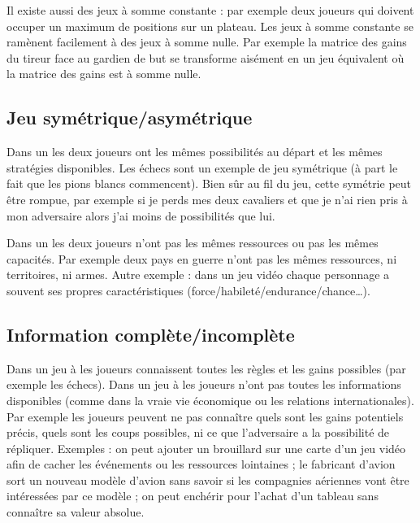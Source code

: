 \documentclass[11pt,class=report,crop=false]{standalone}
\begin{document}
Il existe aussi des jeux à somme constante : par exemple deux joueurs qui doivent occuper un maximum de positions sur un plateau. Les jeux à somme constante se ramènent facilement à des jeux à somme nulle. Par exemple la matrice des gains du tireur face au gardien de but se transforme aisément en un jeu équivalent où la matrice des gains est à somme nulle.






\subsection{Jeu symétrique/asymétrique}

Dans un  les deux joueurs ont les mêmes possibilités au départ et les mêmes stratégies disponibles. 
Les échecs sont un exemple de jeu symétrique (à part le fait que les pions blancs commencent). Bien sûr au fil du jeu, cette symétrie peut être rompue, par exemple si je perds mes deux cavaliers et que je n'ai rien pris à mon adversaire alors j'ai moins de possibilités que lui.

Dans un  les deux joueurs n'ont pas les mêmes ressources ou pas les mêmes capacités. Par exemple deux pays en guerre n'ont pas les mêmes ressources, ni territoires, ni armes. Autre exemple : dans un jeu vidéo chaque personnage a souvent ses propres caractéristiques (force/habileté/endurance/chance\ldots).


\subsection{Information complète/incomplète}

Dans un jeu à  les joueurs connaissent toutes les règles et les gains possibles (par exemple les échecs).
Dans un jeu à  les joueurs n'ont pas toutes les informations disponibles (comme dans la vraie vie économique ou les relations internationales).
Par exemple les joueurs peuvent ne pas connaître quels sont les gains potentiels précis, quels sont les coups possibles, ni ce que l'adversaire a la possibilité de répliquer.
Exemples : on peut ajouter un brouillard sur une carte d'un jeu vidéo afin de cacher les événements ou les ressources lointaines ; 
le fabricant d'avion sort un nouveau modèle d'avion sans savoir si les compagnies aériennes vont être intéressées par ce modèle ; on peut enchérir pour l'achat d'un tableau sans connaître sa valeur absolue.
\end{document}
